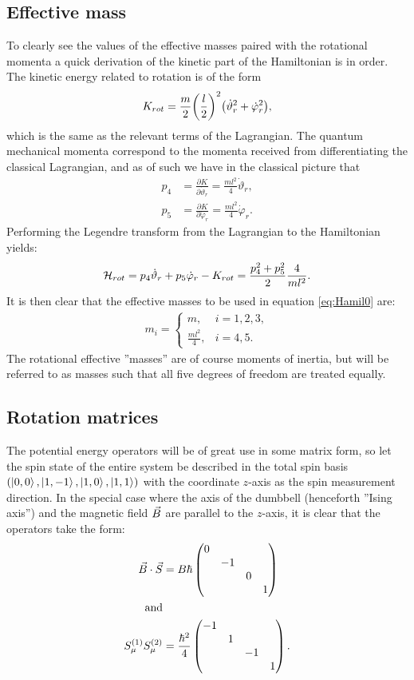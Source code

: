 \documentclass[a4paper]{article}
\begin{document}
\subsection{Effective mass}
To clearly see the values of the effective masses paired with the rotational momenta a quick derivation
of the kinetic part of the Hamiltonian is in order. The kinetic energy related to rotation
is of the form \[
K_{rot}= \frac{m}{2}\pqty{\frac{l}{2}}^2\pqty{\dot \vartheta_r^2 + \dot \varphi_r^2} %
,\] 
which is the same as the relevant terms of the Lagrangian. The quantum mechanical momenta
correspond to the momenta received from differentiating the classical Lagrangian, and as
of %
such we have in the classical picture that 
\begin{align*}
        p_4 &= \frac{\partial K}{\partial \dot \vartheta_r} = \frac{ml^2}{4}\dot
        \vartheta_r,\\
        p_5 &= \frac{\partial K}{\partial \dot \varphi_r} = \frac{ml^2}{4}\dot \varphi_r
.\end{align*}
Performing the Legendre transform from the Lagrangian to the Hamiltonian yields:
\begin{align*}
        \mathbb{\cal H}_{rot}= p_4 \dot\vartheta_r + p_5 \dot\varphi_r - K_{rot} = \frac{
        p_4^2 + p_5^2}{2} \frac{4}{ml^2}
.\end{align*}
It is then clear that the effective masses to be used in equation \ref{eq:Hamil0} are:
\begin{align*}
        m_i = \begin{cases}
                m, & i = 1, 2, 3,\\
                \frac{ml^2}{4}, & i = 4, 5.
        \end{cases}
\end{align*}
The rotational effective ''masses'' are of course moments of inertia, but will be
referred to as masses such that all five degrees of freedom are treated equally.

\subsection{Rotation matrices}
The potential energy operators will be of great use in some matrix form, so let the spin
state of the entire system be described in the total spin basis \((\ket{0, 0}, \ket{1, -1}, \ket{1, 0},
\ket{1, 1})\) with the coordinate \(z\)-axis as the spin measurement direction. In the special case where the axis of the dumbbell (henceforth ''Ising
axis'') and the magnetic field \(\vec{B}\) are parallel to the \(z\)-axis, it is clear that the operators take the form:
\begin{align}
        \va{B}\cdot \va{S} &= B\hbar \label{eq:BSmat}
        \begin{pmatrix}
        \dmat{0,-1,0,1}
        \end{pmatrix} \\
        \text{and}\nonumber\\
        S^{(1)}_{\mu}S^{(2)}_{\mu} &= \frac{\hbar^2}{4} \label{eq:SSmat}
        \begin{pmatrix} 
        \diagonalmatrix{-1,1,-1,1}\end{pmatrix} 
.\end{align}
\end{document}
